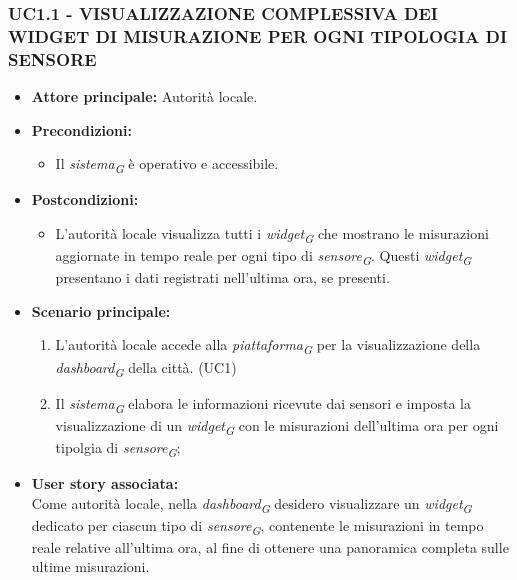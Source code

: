 \subsubsection{UC1.1 - VISUALIZZAZIONE COMPLESSIVA DEI WIDGET DI MISURAZIONE PER OGNI TIPOLOGIA DI SENSORE}
\begin{itemize}
    \item \textbf{Attore principale:} Autorità locale.
    \item \textbf{Precondizioni:}
        \begin{itemize}
            \item Il \textit{sistema}\textsubscript{\textit{G}} è operativo e accessibile.
        \end{itemize}
    \item \textbf{Postcondizioni:}
        \begin{itemize}
            \item L'autorità locale visualizza tutti i \textit{widget}\textsubscript{\textit{G}} che mostrano le misurazioni aggiornate in tempo reale per ogni tipo di \textit{sensore}\textsubscript{\textit{G}}. Questi \textit{widget}\textsubscript{\textit{G}} presentano i dati registrati nell'ultima ora, se presenti.
        \end{itemize}
    \item \textbf{Scenario principale:}
        \begin{enumerate}
            \item L'autorità locale accede alla \textit{piattaforma}\textsubscript{\textit{G}} per la visualizzazione della \textit{dashboard}\textsubscript{\textit{G}} della città. (UC1)
            \item Il \textit{sistema}\textsubscript{\textit{G}} elabora le informazioni ricevute dai sensori e imposta la visualizzazione di un \textit{widget}\textsubscript{\textit{G}} con le misurazioni dell'ultima ora per ogni tipolgia di \textit{sensore}\textsubscript{\textit{G}};
        \end{enumerate}
    \item \textbf{User story associata:} \\
        Come autorità locale, nella \textit{dashboard}\textsubscript{\textit{G}} desidero visualizzare un \textit{widget}\textsubscript{\textit{G}} dedicato per ciascun tipo di \textit{sensore}\textsubscript{\textit{G}}, contenente le misurazioni in tempo reale relative all'ultima ora, al fine di ottenere una panoramica completa sulle ultime misurazioni.
\end{itemize}
